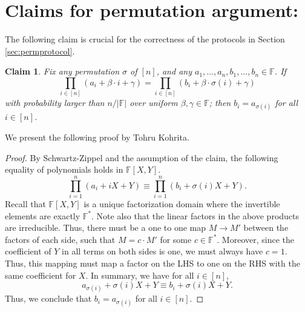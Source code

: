 \documentclass[11pt]{article} %
\newcommand{\F}{\ensuremath{\mathbb F}\xspace}
\newtheorem{lemma}{Lemma}[section]
\newtheorem{claim}[lemma]{Claim}
\begin{document}
\appendix
    
    

\section{Claims for permutation argument:}
The following claim is crucial for the correctness of the protocols in Section \ref{sec:permprotocol}.
\begin{claim}\label{clm:randpermO}
Fix any permutation $\sigma$ of $[n]$, and any $a_1,\ldots,a_n,b_1,\ldots,b_n \in \F$.
 If 
 \[\prod_{i\in [n]} (a_i + \beta \cdot i + \gamma) = \prod_{i\in [n]} (b_i+ \beta \cdot \sigma(i) + \gamma)\] 
 with probability larger than $n/|\F|$ over uniform $\beta,\gamma \in \F$;
 then  $b_i = a_{\sigma(i)}$ for all $i \in [n]$.
\end{claim}

% 


\noindent
We present the following proof by Tohru Kohrita.

\begin{proof}  

By Schwartz-Zippel and the assumption of the claim, the following equality of polynomials holds in $\F[X,Y]$.
\[\prod_{i=1}^n(a_i+iX +Y) \equiv  \prod_{i=1}^n(b_i+\sigma(i)X +Y).\]
 Recall that $\F[X,Y]$ is a unique factorization domain where the invertible elements are exactly $\F^*$. Note also that the linear factors in the above products are irreducible. Thus, there must be a one to one map $M\to M'$ between the factors of each side, such that $M=c\cdot M'$ for some $c\in \F^*$.
Moreover, since the coefficient of $Y$ in all terms on both sides is one, we must always have $c=1$.
Thus, this mapping must map a factor on the LHS to one on the RHS with the same coefficient for $X$.
In summary, we have for all $i\in [n]$, 
\[a_{\sigma(i)}+\sigma(i)X +Y \equiv b_i+\sigma(i)X +Y.\]
 Thus, we conclude that $b_i = a_{\sigma(i)}$  for all $i\in [n]$.
\end{proof}
\end{document}
